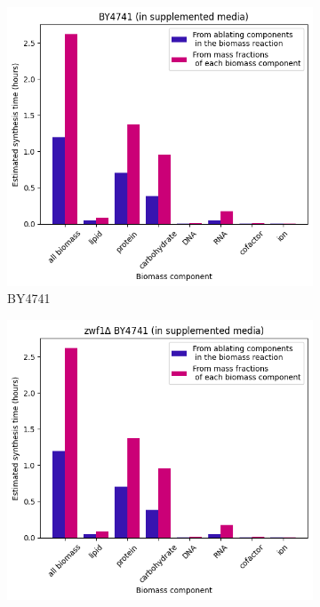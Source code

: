 \begin{figure}
  \centering
  \begin{subfigure}[htpb]{0.45\textwidth}
   \centering
   \includegraphics[width=\textwidth]{ablation_by4741}
   \caption{
     BY4741
   }
   \label{fig:model-ablation-by4741}
  \end{subfigure}
  \begin{subfigure}[htpb]{0.45\textwidth}
   \centering
   \includegraphics[width=\textwidth]{ablation_zwf1}

\end{subfigure}
\end{figure}
